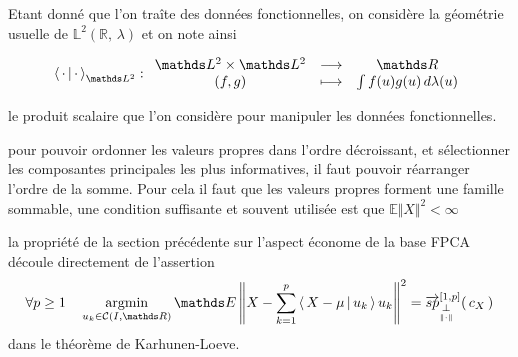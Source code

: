 \bigskip

Etant donné que l'on traîte des données fonctionnelles, on considère la géométrie usuelle de $\mathds L^2(\mathds R, \, \lambda)$ et on note ainsi

\begin{equation*}
	\prodscalselon \cdot \cdot {\mathds L^2}: \begin{array}{ccc}
		\mathds L^2 \times \mathds L^2 & \longrightarrow & \mathds R
		\\
		(f,g)                          & \longmapsto     & \int f(u)g(u) \, d\lambda(u)
	\end{array}
\end{equation*}


le produit scalaire que l'on considère pour manipuler les données fonctionnelles.



\begin{rem}
	pour pouvoir ordonner les valeurs propres dans l'ordre décroissant, et sélectionner les composantes principales les plus informatives, il faut pouvoir réarranger l'ordre de la somme. Pour cela il faut que les valeurs propres forment une famille sommable, une condition suffisante et souvent utilisée est que $\mathds E \Vert X \Vert^2 < \infty$
\end{rem}

\begin{rem}
	la propriété de la section précédente sur l'aspect économe de la base FPCA découle directement de l'assertion
	\begin{equation*}
		\forall p \geq 1
		\quad
		\argmin\limits_{u_k \in \mathcal C(I, \mathds R)} \mathds E \left\Vert X - \sum\limits_{k=1}^p \prodscal {X - \mu} {u_k} u_k \right\Vert^2 = \overrightarrow{sp}_{\orthonormal}^{[1,p]}( \, c_X \, )
	\end{equation*}
	dans le théorème de Karhunen-Loeve.
\end{rem}


